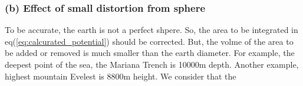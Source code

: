 \documentclass{jarticle}
\begin{document}
\subsubsection*{(b) Effect of small distortion from sphere} 

To be accurate, the earth is not a perfect shpere. So, the area to be integrated in eq(\ref{eq:calcurated_potential}) should be corrected. But, the volme of the area to be added or removed is much smaller than the earth diameter. For example, the deepest point of the sea, the Mariana Trench is 10000m depth. Another example, highest mountain Evelest is 8800m height. 
We consider that the 
\end{document}
